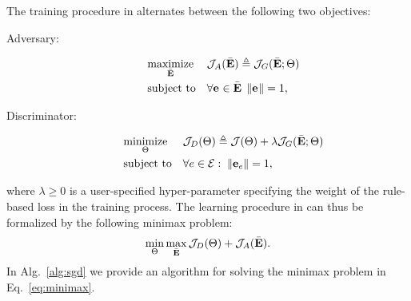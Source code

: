 %
The training procedure in \ARI alternates between the following two objectives:
%
\begin{description}
%
 \item[Adversary:]
 \begin{equation} \label{eq:oadversary}
 \begin{aligned}
 & \underset{\bar{\mathbf{E}}}{\text{maximize}}
 & & \mathcal{J}_{A}(\bar{\mathbf{E}}) \triangleq \mathcal{J}_{G}(\bar{\mathbf{E}} ; \Theta) \\
 & \text{subject to}
 & & \displaystyle{\forall \ensuremath{\mathbf{e}_{}} \in \ensuremath{\bar{\mathbf{E}}}\; \left\lVert\ensuremath{\mathbf{e}_{}}\right\rVert = 1,}
 \end{aligned}
 \end{equation}
%
 \item[Discriminator:]
 \begin{equation} \label{eq:odiscriminator}
 \begin{aligned}
 & \underset{\Theta}{\text{minimize}}
 & & \mathcal{J}_{D}(\Theta) \triangleq \mathcal{J}(\Theta) + \lambda \mathcal{J}_{G}(\bar{\mathbf{E}} ; \Theta)\\
 & \text{subject to}
 & & \displaystyle{\forall e \in \ensuremath{\mathcal{E}}: \; \left\lVert\ensuremath{\mathbf{e}_{e}}\right\rVert = 1,}
 \end{aligned}
 \end{equation}
%
\end{description}
%
\noindent where $\lambda \geq 0$ is a user-specified hyper-parameter specifying the weight of the rule-based loss in the training process.
%
The learning procedure in \ARI can thus be formalized by the following minimax problem:
%
\begin{equation} \label{eq:minimax}
%
 \min_{\params} \max_{\Aemb} \dloss(\params) + \aloss(\Aemb).
%
\end{equation}
%
In Alg.~\ref{alg:sgd} we provide an algorithm for solving the minimax problem in Eq.~\ref{eq:minimax}.
%